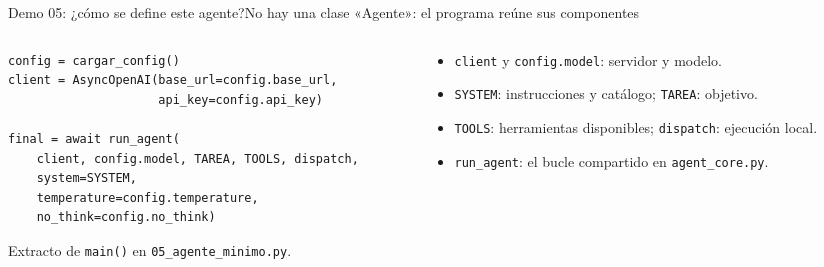 \begin{frame}[fragile]{Demo 05: ¿cómo se define este agente?}{No hay una clase «Agente»: el programa reúne sus componentes}
	\begin{columns}[T]
		\begin{column}{0.57\textwidth}
			\begin{lstlisting}
config = cargar_config()
client = AsyncOpenAI(base_url=config.base_url,
                     api_key=config.api_key)

final = await run_agent(
    client, config.model, TAREA, TOOLS, dispatch,
    system=SYSTEM,
    temperature=config.temperature,
    no_think=config.no_think)
\end{lstlisting}
			{\scriptsize Extracto de \texttt{main()} en \texttt{05\_agente\_minimo.py}.}
		\end{column}
		\begin{column}{0.41\textwidth}
			\footnotesize
			\begin{itemize}
				\setlength{\itemsep}{1pt}
				\item \texttt{client} y \texttt{config.model}: servidor y modelo.
				\item \texttt{SYSTEM}: instrucciones y catálogo; \texttt{TAREA}: objetivo.
				\item \texttt{TOOLS}: herramientas disponibles; \texttt{dispatch}: ejecución local.
				\item \texttt{run\_agent}: el bucle compartido en \texttt{agent\_core.py}.
			\end{itemize}
		\end{column}
	\end{columns}
\end{frame}

